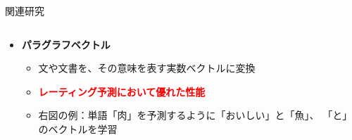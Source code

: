 \documentclass[unicode,10pt]{beamer}
\newcommand{\itemtitle}[1]{\textbf{#1}\\}
\newcommand{\fire}[1]{\textcolor{red}{\textbf{#1}}}
\newcommand{\doublecolumns}[4]{
    \begin{minipage}[t]{#1}
      #2
    \end{minipage}
    \begin{minipage}[t]{#3}
      #4
    \end{minipage}}
\begin{document}
\begin{frame}[t]
\begin{block}{関連研究}
\begin{columns}[onlytextwidth,t]
    \begin{column}{0.375\textwidth}
      \begin{itemize}
        \item \itemtitle{パラグラフベクトル\cite{quoc14}}
          \begin{itemize}
            \item 文や文書を、その意味を表す実数ベクトルに変換
            \item \fire{レーティング予測において優れた性能}
            \item 右図の例：単語「肉」を予測するように「おいしい」と「魚」、
                  「と」のベクトルを学習
          \end{itemize}
      \end{itemize}
    \end{column}


\end{columns}
\end{block}
\end{frame}
\end{document}
